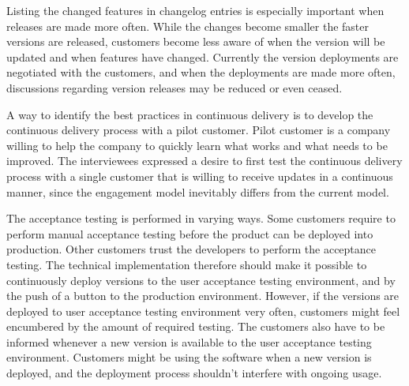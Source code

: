 \documentclass[lnbip]{svmultln}
\def\signed#1{{\leavevmode\unskip\nobreak\hfil\penalty50\hskip2em
  \hbox{}\nobreak\hfil\raise-3pt\hbox{(#1)}%
  \parfillskip=0pt \finalhyphendemerits=0 \endgraf}}
\newenvironment{aquote}[1]
  {\savebox\mybox{#1}\begin{quotation}}
  {\signed{\usebox\mybox}\end{quotation}}
\begin{document}

Listing the changed features in changelog entries is especially important when releases are made more often. While the changes become smaller the faster versions are released, customers become less aware of when the version will be updated and when features have changed. Currently the version deployments are negotiated with the customers, and when the deployments are made more often, discussions regarding version releases may be reduced or even ceased.%

A way to identify the best practices in continuous delivery is to develop the continuous delivery process with a pilot customer. Pilot customer is a company willing to help the company to quickly learn what works and what needs to be improved. The interviewees expressed a desire to first test the continuous delivery process with a single customer that is willing to receive updates in a continuous manner, since the engagement model inevitably differs from the current model.%

The acceptance testing is performed in varying ways. Some customers require to perform manual acceptance testing before the product can be deployed into production. Other customers trust the developers to perform the acceptance testing. The technical implementation therefore should make it possible to continuously deploy versions to the user acceptance testing environment, and by the push of a button to the production environment. However, if the versions are deployed to user acceptance testing environment very often, customers might feel encumbered by the amount of required testing. The customers also have to be informed whenever a new version is available to the user acceptance testing environment. Customers might be using the software when a new version is deployed, and the deployment process shouldn't interfere with ongoing usage.
\end{document}
